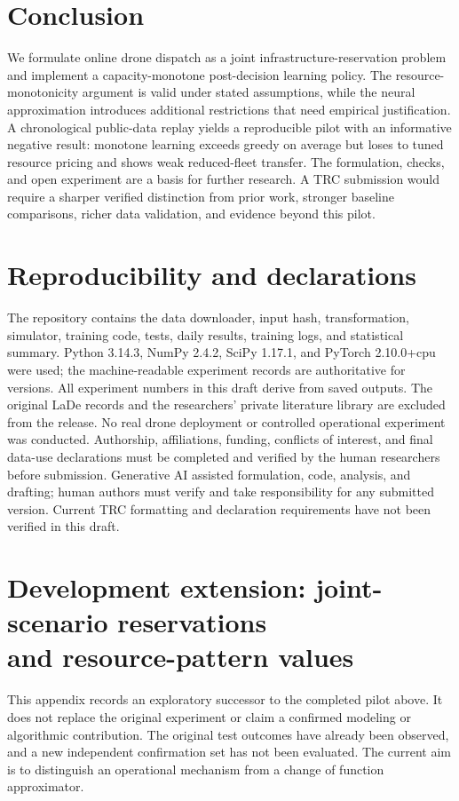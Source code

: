 \documentclass[11pt,a4paper]{article}
\begin{document}
\section{Conclusion}
We formulate online drone dispatch as a joint infrastructure-reservation problem and implement a capacity-monotone post-decision learning policy. The resource-monotonicity argument is valid under stated assumptions, while the neural approximation introduces additional restrictions that need empirical justification. A chronological public-data replay yields a reproducible pilot with an informative negative result: monotone learning exceeds greedy on average but loses to tuned resource pricing and shows weak reduced-fleet transfer. The formulation, checks, and open experiment are a basis for further research. A TRC submission would require a sharper verified distinction from prior work, stronger baseline comparisons, richer data validation, and evidence beyond this pilot.

\section*{Reproducibility and declarations}
The repository contains the data downloader, input hash, transformation, simulator, training code, tests, daily results, training logs, and statistical summary. Python 3.14.3, NumPy 2.4.2, SciPy 1.17.1, and PyTorch 2.10.0+cpu were used; the machine-readable experiment records are authoritative for versions. All experiment numbers in this draft derive from saved outputs. The original LaDe records and the researchers' private literature library are excluded from the release. No real drone deployment or controlled operational experiment was conducted. Authorship, affiliations, funding, conflicts of interest, and final data-use declarations must be completed and verified by the human researchers before submission. Generative AI assisted formulation, code, analysis, and drafting; human authors must verify and take responsibility for any submitted version. Current TRC formatting and declaration requirements have not been verified in this draft.

\appendix
\section[Development extension: joint-scenario reservations and resource-pattern values]{Development extension: joint-scenario reservations\\and resource-pattern values}
\label{app:development}
This appendix records an exploratory successor to the completed pilot above. It does not replace the original experiment or claim a confirmed modeling or algorithmic contribution. The original test outcomes have already been observed, and a new independent confirmation set has not been evaluated. The current aim is to distinguish an operational mechanism from a change of function approximator.
\end{document}
